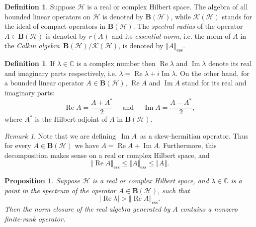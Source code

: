 \documentclass{tran-l}
\newtheorem{prop}[thm]{Proposition}
\theoremstyle{definition}
\newtheorem{defn}[thm]{Definition}
\theoremstyle{remark}
\newtheorem{rem}[thm]{Remark}
\numberwithin{equation}{subsection}
\DeclareMathOperator{\RE}{Re}
\DeclareMathOperator{\IM}{Im}
\DeclareMathOperator{\ess}{ess}
\newcommand{\h}{\mathcal{H}}
\newcommand{\BH}{\mathbf{B}(\mathcal{H})}
\newcommand{\KH}{\mathcal{K}(\mathcal{H})}
\newcommand{\Complex}{\mathbb{C}}
\newcommand{\abs}[1]{\left\vert#1\right\vert}
\newcommand{\norm}[1]{\left\Vert#1\right\Vert}
\newcommand{\essnorm}[1]{\norm{#1}_{\ess}}
\begin{document}
\begin{defn}
Suppose $\h$ is a real or complex Hilbert space. The algebra of all bounded linear operators on $\h$ is denoted by $\BH$, while $\KH$ stands for the ideal of compact operators in $\BH$. The \emph{spectral radius} of the operator $A\in\BH$ is denoted by $r(A)$ and its \emph{essential norm}, i.e. the norm of $A$ in the \emph{Calkin algebra}\, $\BH/\KH$, is denoted by $\essnorm{A}$.
\end{defn}

\begin{defn}
If $\lambda\in\Complex$ is a complex number then $\RE\lambda$ and $\IM\lambda$ denote its real and imaginary parts respectively, i.e. $\lambda=\RE\lambda+i\IM\lambda$. On the other hand, for a bounded linear operator $A\in\BH$, $\RE{A}$ and $\IM{A}$ stand for its real and imaginary parts:
\[ \RE{A}=\frac{A+A^*}{2} \quad \text{ and } \quad
   \IM{A}=\frac{A-A^*}{2}, \]
where $A^*$ is the Hilbert adjoint of $A$ in $\BH$.
\end{defn}

\begin{rem}
Note that we are defining $\,\IM{A}\,$ as a skew-hermitian operator. Thus for every $A\in\BH$ we have $A=\RE{A}+\IM{A}$. Furthermore, this decomposition makes sense on a real or complex Hilbert space, and
\begin{equation}\label{e:EssIE}
  \essnorm{\RE{A}} \leq \essnorm{A} \leq \norm{A}.
\end{equation}
\end{rem}

\begin{prop}\label{p:ESSPECT}
Suppose $\h$ is a real or complex Hilbert space, and $\lambda\in\Complex$ is a point in the spectrum of the operator $A\in\BH$, such that
\begin{equation} \label{e:ESSINEQ}
  \abs{\RE\lambda} > \essnorm{\RE{A}}.
\end{equation}
Then the norm closure of the real algebra generated by $A$ contains a nonzero finite-rank operator.
\end{prop}
\end{document}

